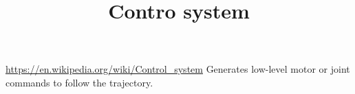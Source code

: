 \documentclass[a4paper]{article}
\title{Contro system}
\date{}
\begin{document}
    \maketitle
    \url{https://en.wikipedia.org/wiki/Control_system}
    Generates low-level motor or joint commands to follow the trajectory.
\end{document}
